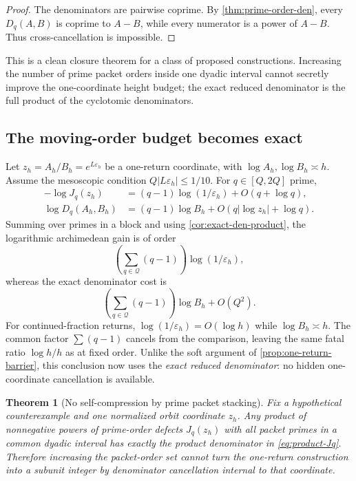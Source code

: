 \documentclass[11pt]{article}
\newtheorem{theorem}{Theorem}[section]
\theoremstyle{definition}
\theoremstyle{remark}
\newcommand{\eps}{\varepsilon}
\begin{document}
\begin{proof}
The denominators are pairwise coprime.  By \cref{thm:prime-order-den}, every $D_q(A,B)$ is coprime to $A-B$, while every numerator is a power of $A-B$.  Thus cross-cancellation is impossible.
\end{proof}

This is a clean closure theorem for a class of proposed constructions.  Increasing the number of prime packet orders inside one dyadic interval cannot secretly improve the one-coordinate height budget; the exact reduced denominator is the full product of the cyclotomic denominators.

\subsection{The moving-order budget becomes exact}

Let $z_h=A_h/B_h=e^{L\eps_h}$ be a one-return coordinate, with $\log A_h,\log B_h\asymp h$.  Assume the mesoscopic condition $Q|L\eps_h|\le1/10$.  For $q\in[Q,2Q]$ prime,
\begin{align}
 -\log J_q(z_h)&=(q-1)\log(1/\eps_h)+O(q+\log q),\label{eq:Jq-small}\\
 \log D_q(A_h,B_h)&=(q-1)\log B_h+O(q|\log z_h|+\log q).
 \label{eq:Dq-large}
\end{align}
Summing over primes in a block and using \cref{cor:exact-den-product}, the logarithmic archimedean gain is of order
\begin{equation}\label{eq:prime-block-gain}
 \left(\sum_{q\in\mathcal Q}(q-1)\right)\log(1/\eps_h),
\end{equation}
whereas the exact denominator cost is
\begin{equation}\label{eq:prime-block-cost}
 \left(\sum_{q\in\mathcal Q}(q-1)\right)\log B_h+O(Q^2).
\end{equation}
For continued-fraction returns, $\log(1/\eps_h)=O(\log h)$ while $\log B_h\asymp h$.  The common factor $\sum(q-1)$ cancels from the comparison, leaving the same fatal ratio $\log h/h$ as at fixed order.  Unlike the soft argument of \cref{prop:one-return-barrier}, this conclusion now uses the \emph{exact reduced denominator}: no hidden one-coordinate cancellation is available.

\begin{theorem}[No self-compression by prime packet stacking]\label{thm:no-self-compression}
Fix a hypothetical counterexample and one normalized orbit coordinate $z_h$.  Any product of nonnegative powers of prime-order defects $J_q(z_h)$ with all packet primes in a common dyadic interval has exactly the product denominator in \eqref{eq:product-Jq}.  Therefore increasing the packet-order set cannot turn the one-return construction into a subunit integer by denominator cancellation internal to that coordinate.
\end{theorem}
\end{document}
